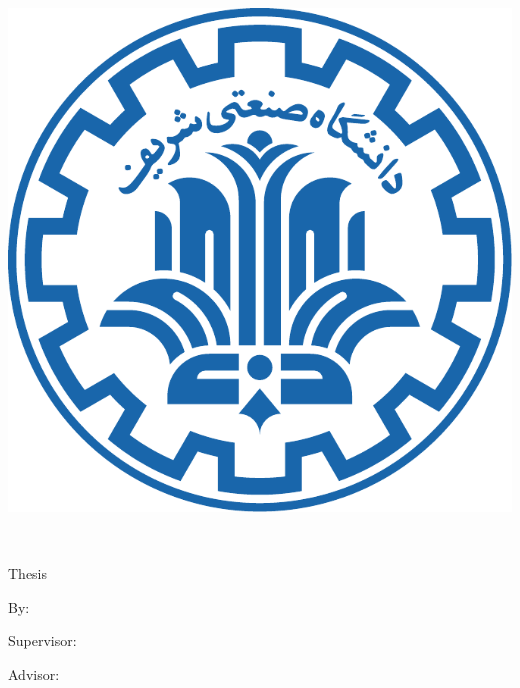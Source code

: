 

\begin{center}

\begin{latin}

\includegraphics[scale=0.25]{front/template/images/logo}

\EnglishThesisUniversity \\
\EnglishThesisDepartment

\begin{large}
\vspace{0.7cm}
\EnglishThesisDegree{} Thesis


\vspace{1.5cm}

{\Large\textbf\EnglishThesisTitle}

\vspace{1.5cm}

{\normalsize By:}\\
\textbf{\EnglishThesisAuthor}

\vspace{1cm}

{\normalsize Supervisor:}\\ 
\textbf{\EnglishThesisSupervisor}

\vspace{1cm}

{\normalsize Advisor:}\\ 
\textbf{\EnglishThesisAdvisor}

\end{large}

\vspace{1.5cm}
\EnglishThesisDate

\end{latin}

\end{center}
